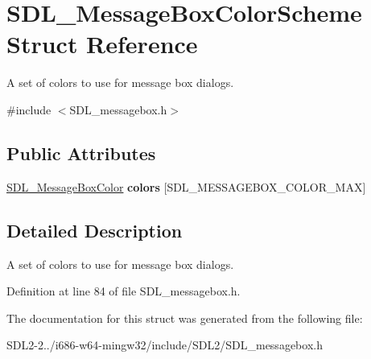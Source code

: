 \hypertarget{structSDL__MessageBoxColorScheme}{\section{S\+D\+L\+\_\+\+Message\+Box\+Color\+Scheme Struct Reference}
\label{structSDL__MessageBoxColorScheme}
}


A set of colors to use for message box dialogs.  




{\ttfamily \#include $<$S\+D\+L\+\_\+messagebox.\+h$>$}

\subsection*{Public Attributes}
\begin{DoxyCompactItemize}
\item 
\hypertarget{structSDL__MessageBoxColorScheme_a6e850e9f80c5189b07fa31bfa590648b}{\hyperlink{structSDL__MessageBoxColor}{S\+D\+L\+\_\+\+Message\+Box\+Color} {\bfseries colors} \mbox{[}S\+D\+L\+\_\+\+M\+E\+S\+S\+A\+G\+E\+B\+O\+X\+\_\+\+C\+O\+L\+O\+R\+\_\+\+M\+A\+X\mbox{]}}\label{structSDL__MessageBoxColorScheme_a6e850e9f80c5189b07fa31bfa590648b}

\end{DoxyCompactItemize}


\subsection{Detailed Description}
A set of colors to use for message box dialogs. 

Definition at line 84 of file S\+D\+L\+\_\+messagebox.\+h.



The documentation for this struct was generated from the following file\+:\begin{DoxyCompactItemize}
\item 
S\+D\+L2-\/2../i686-\/w64-\/mingw32/include/\+S\+D\+L2/S\+D\+L\+\_\+messagebox.\+h\end{DoxyCompactItemize}

